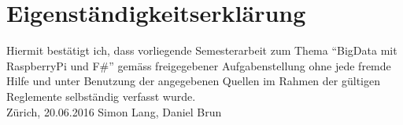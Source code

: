 
\chapter*{Eigenständigkeitserklärung}
\thispagestyle{empty}
%
Hiermit bestätigt ich, dass vorliegende Semesterarbeit zum Thema "`BigData mit RaspberryPi und F\#"'
gemäss freigegebener Aufgabenstellung ohne jede fremde Hilfe und unter Benutzung der angegebenen Quellen im Rahmen der gültigen Reglemente selbständig verfasst wurde. 
%
\mbox{}\vspace{4\baselineskip}\\
%
Zürich, 20.06.2016 \hfill Simon Lang, Daniel Brun
\clearpage\mbox{}\thispagestyle{empty}


%

